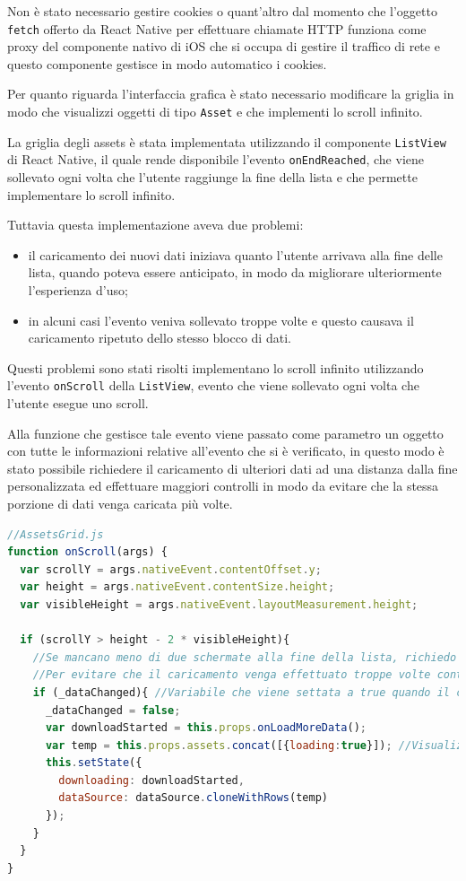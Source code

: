 Non è stato necessario gestire cookies o quant'altro dal momento che l'oggetto \texttt{fetch} offerto da React Native per effettuare chiamate HTTP funziona come proxy del componente nativo di iOS che si occupa di gestire il traffico di rete e questo componente gestisce in modo automatico i cookies.

Per quanto riguarda l'interfaccia grafica è stato necessario modificare la griglia in modo che visualizzi oggetti di tipo \texttt{Asset} e che implementi lo scroll infinito.

La griglia degli assets è stata implementata utilizzando il componente \texttt{ListView} di React Native, il quale rende disponibile l'evento \texttt{onEndReached}, che viene sollevato ogni volta che l'utente raggiunge la fine della lista e che permette implementare lo scroll infinito. 

Tuttavia questa implementazione aveva due problemi:
\begin{itemize}
\item il caricamento dei nuovi dati iniziava quanto l'utente arrivava alla fine delle lista, quando poteva essere anticipato, in modo da migliorare ulteriormente l'esperienza d'uso;
\item in alcuni casi l'evento veniva sollevato troppe volte e questo causava il caricamento ripetuto dello stesso blocco di dati.
\end{itemize}

Questi problemi sono stati risolti implementano lo scroll infinito utilizzando l'evento \texttt{onScroll} della \texttt{ListView}, evento che viene sollevato ogni volta che l'utente esegue uno scroll.

Alla funzione che gestisce tale evento viene passato come parametro un oggetto con tutte le informazioni relative all'evento che si è verificato, in questo modo è stato possibile richiedere il caricamento di ulteriori dati ad una distanza dalla fine personalizzata ed effettuare maggiori controlli in modo da evitare che la stessa porzione di dati venga caricata più volte.

\begin{lstlisting}[language=JavaScript, caption=Funzione che gestisce l'evento onScroll della griglia che visualizza gli assets]
//AssetsGrid.js
function onScroll(args) {
  var scrollY = args.nativeEvent.contentOffset.y;
  var height = args.nativeEvent.contentSize.height;
  var visibleHeight = args.nativeEvent.layoutMeasurement.height;

  if (scrollY > height - 2 * visibleHeight){
    //Se mancano meno di due schermate alla fine della lista, richiedo il caricamento di ulteriori dati
    //Per evitare che il caricamento venga effettuato troppe volte controllo che i dati siano cambiati rispetto all'ultima volta che ho effettuato il caricamento.
    if (_dataChanged){ //Variabile che viene settata a true quando il componente riceve dei dati nuovi
      _dataChanged = false;
      var downloadStarted = this.props.onLoadMoreData();
      var temp = this.props.assets.concat([{loading:true}]); //Visualizza un'indicatore di caricamento
      this.setState({
        downloading: downloadStarted,
        dataSource: dataSource.cloneWithRows(temp)
      });
    }
  }
}
\end{lstlisting}

